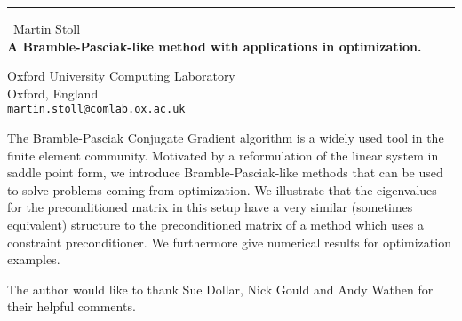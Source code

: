 \documentclass{report}
\begin{document}
\begin{center}
\rule{6in}{1pt} \
{\large Martin Stoll \\
{\bf A Bramble-Pasciak-like method with applications in optimization.}}

Oxford University Computing Laboratory \\ 
Oxford, England \\
{\tt martin.stoll@comlab.ox.ac.uk} \\
\end{center}

The Bramble-Pasciak Conjugate Gradient algorithm is a widely used tool in the finite element community. Motivated by a reformulation of the linear system in saddle point form, we introduce Bramble-Pasciak-like methods that can be used to solve problems coming from optimization. We illustrate that the eigenvalues for the preconditioned matrix in this setup have a very similar (sometimes equivalent) structure to the preconditioned matrix of a method which uses a constraint preconditioner. We furthermore give numerical results for optimization examples.

The author would like to thank Sue Dollar, Nick Gould and Andy Wathen for their helpful comments.
\end{document}
